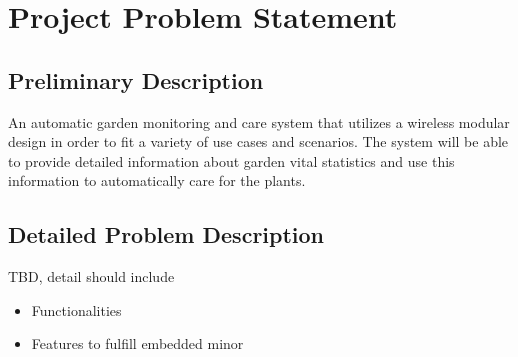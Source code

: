 \chapter{Project Problem Statement}

\section{Preliminary Description}
	An automatic garden monitoring and care system that utilizes a wireless modular design in order to fit a variety of use cases and scenarios. The system will be able to provide detailed information about garden vital statistics and use this information to automatically care for the plants.
	
\section{Detailed Problem Description}
	TBD, detail should include
	\begin{itemize}
		\item Functionalities
		\item Features to fulfill embedded minor 
	\end{itemize}
